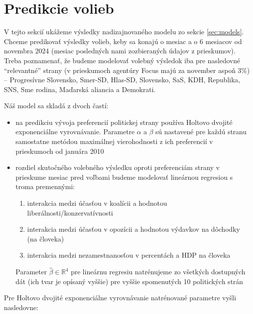 \documentclass[main.tex]{subfiles}
\begin{document}
	
\section{Predikcie volieb}	

V tejto sekcií ukážeme výsledky nadizajnovaného modelu zo sekcie \ref{sec:models}. Chceme predikovať výsledky volieb, keby sa konajú o mesiac a o 6 mesiacov od novembra 2024 (mesiac posledných nami zozbieraných údajov z prieskumov). Treba poznamenať, že budeme modelovať volebný výsledok iba pre nasledovné \enquote{relevantné} strany (v prieskumoch agentúry Focus majú za november aspoň 3\%) --  Progresívne Slovensko, Smer-SD, Hlas-SD, Slovensko, SaS, KDH, Republika, SNS, Sme rodina, Maďarská aliancia a Demokrati.

Náš model sa skladá z dvoch častí:


\begin{itemize}
	\item na predikciu vývoja preferencií politickej strany používa Holtovo dvojité exponenciálne vyrovnávanie. Parametre $\alpha$ a $\beta$ sú nastavené pre každú stranu samostatne metódou maximálnej vierohodnosti z ich preferencií v prieskumoch od januára 2010 \\
	\item rozdiel skutočného volebného výsledku oproti preferenciám strany v prieskume mesiac pred voľbami budeme modelovať lineárnou regresiou s troma premennými:
	\begin{enumerate}
		\item interakcia medzi účasťou v koalícii a hodnotou liberálnosti/konzervatívnosti
		\item interakcia medzi účasťou v opozícii a hodnotou výdavkov na dôchodky (na človeka)
		\item interakcia medzi nezamestnanosťou v percentách a HDP na človeka
	\end{enumerate}
	Parameter $\hat{\beta} \in \mathbb{R}^4$ pre lineárnu regresiu natrénujeme zo všetkých dostupných dát (ich tvar je opísaný vyššie) pre vyššie spomenutých 10 politických strán
\end{itemize}

Pre Holtovo dvojité exponenciálne vyrovnávanie natrénované parametre vyšli nasledovne:
\end{document}
